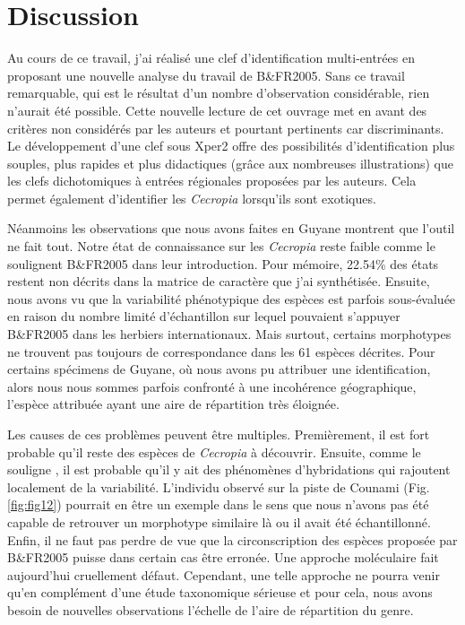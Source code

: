 \documentclass[a4paper]{article}
\theoremstyle{definition}
\theoremstyle{definition}
\theoremstyle{definition}
\theoremstyle{remark}
\begin{document}
\pagebreak

\section{Discussion}\label{discussion}

Au cours de ce travail, j'ai réalisé une clef d'identification
multi-entrées en proposant une nouvelle analyse du travail de B\&FR2005.
Sans ce travail remarquable, qui est le résultat d'un nombre
d'observation considérable, rien n'aurait été possible. Cette nouvelle
lecture de cet ouvrage met en avant des critères non considérés par les
auteurs et pourtant pertinents car discriminants. Le développement d'une
clef sous Xper2 offre des possibilités d'identification plus souples,
plus rapides et plus didactiques (grâce aux nombreuses illustrations)
que les clefs dichotomiques à entrées régionales proposées par les
auteurs. Cela permet également d'identifier les \emph{Cecropia}
lorsqu'ils sont exotiques.

Néanmoins les observations que nous avons faites en Guyane montrent que
l'outil ne fait tout. Notre état de connaissance sur les \emph{Cecropia}
reste faible comme le soulignent B\&FR2005 dans leur introduction. Pour
mémoire, 22.54\% des états restent non décrits dans la matrice de
caractère que j'ai synthétisée. Ensuite, nous avons vu que la
variabilité phénotypique des espèces est parfois sous-évaluée en raison
du nombre limité d'échantillon sur lequel pouvaient s'appuyer B\&FR2005
dans les herbiers internationaux. Mais surtout, certains morphotypes ne
trouvent pas toujours de correspondance dans les 61 espèces décrites.
Pour certains spécimens de Guyane, où nous avons pu attribuer une
identification, alors nous nous sommes parfois confronté à une
incohérence géographique, l'espèce attribuée ayant une aire de
répartition très éloignée.

Les causes de ces problèmes peuvent être multiples. Premièrement, il est
fort probable qu'il reste des espèces de \emph{Cecropia} à découvrir.
Ensuite, comme le souligne \citet{Webber2011}, il est probable qu'il y
ait des phénomènes d'hybridations qui rajoutent localement de la
variabilité. L'individu observé sur la piste de Counami (Fig.
\ref{fig:fig12}) pourrait en être un exemple dans le sens que nous
n'avons pas été capable de retrouver un morphotype similaire là ou il
avait été échantillonné. Enfin, il ne faut pas perdre de vue que la
circonscription des espèces proposée par B\&FR2005 puisse dans certain
cas être erronée. Une approche moléculaire fait aujourd'hui cruellement
défaut. Cependant, une telle approche ne pourra venir qu'en complément
d'une étude taxonomique sérieuse et pour cela, nous avons besoin de
nouvelles observations l'échelle de l'aire de répartition du genre.
\end{document}
